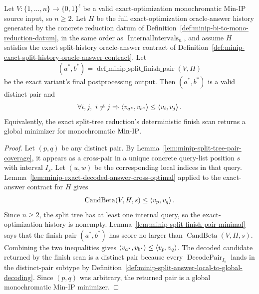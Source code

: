 \begin{lemma}
  \label{lem:minip-recursive-exact-answer-combination}
  Let $V:\{1,\ldots,n\}\to\{0,1\}^{\ell}$ be a valid exact-optimization
  monochromatic Min-IP source input, so $n\geq2$.  Let $H$ be the full
  exact-optimization oracle-answer history generated by the concrete reduction
  datum of Definition~\ref{def:minip-bi-to-mono-reduction-datum}, in the same
  order as $\operatorname{InternalIntervals}_n$, and assume $H$ satisfies the
  exact split-history oracle-answer contract of
  Definition~\ref{def:minip-exact-split-history-oracle-answer-contract}.  Let
  \[
    (a^*,b^*)=
      \operatorname{def\_minip\_split\_finish\_pair}(V,H)
  \]
  be the exact variant's final postprocessing output.  Then $(a^*,b^*)$ is a
  valid distinct pair and
  \[
    \forall i,j,\ i\neq j\Rightarrow
      \ip{v_{a^*}}{v_{b^*}}\leq\ip{v_i}{v_j}.
  \]
  Equivalently, the exact split-tree reduction's deterministic finish scan
  returns a global minimizer for monochromatic $\mathrm{Min\mbox{-}IP}$.
\end{lemma}
\begin{proof}
  Let $(p,q)$ be any distinct pair.  By
  Lemma~\ref{lem:minip-split-tree-pair-coverage}, it appears as a cross-pair
  in a unique concrete query-list position $s$ with interval $I_s$.  Let
  $(u,w)$ be the corresponding local indices in that query.  Lemma~\ref{lem:minip-exact-decoded-answer-cross-optimal}
  applied to the exact-answer contract for $H$ gives
  \[
    \operatorname{CandBeta}(V,H,s)\leq\left\langle v_p,v_q\right\rangle.
  \]
  Since $n\geq2$, the split tree has at least one internal query, so the
  exact-optimization history is nonempty.  Lemma~\ref{lem:minip-split-finish-pair-minimal}
  says that the finish pair $(a^*,b^*)$ has score no larger than
  $\operatorname{CandBeta}(V,H,s)$.  Combining the two inequalities gives
  $\left\langle v_{a^*},v_{b^*}\right\rangle\leq\left\langle v_p,v_q\right\rangle$.  The decoded candidate returned by
  the finish scan is a distinct pair because every
  $\operatorname{DecodePair}_{I_s}$ lands in the distinct-pair subtype by
  Definition~\ref{def:minip-split-answer-local-to-global-decoding}.  Since
  $(p,q)$ was arbitrary, the returned pair is a global monochromatic Min-IP
  minimizer.
\end{proof}

